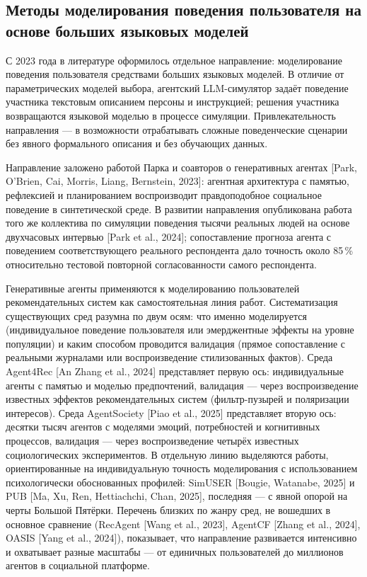 \subsection{Методы моделирования поведения пользователя на основе больших языковых моделей}

С 2023 года в литературе оформилось отдельное направление: моделирование поведения пользователя средствами больших языковых моделей. В отличие от параметрических моделей выбора, агентский LLM-симулятор задаёт поведение участника текстовым описанием персоны и инструкцией; решения участника возвращаются языковой моделью в процессе симуляции. Привлекательность направления --- в возможности отрабатывать сложные поведенческие сценарии без явного формального описания и без обучающих данных.

Направление заложено работой Парка и соавторов о генеративных агентах [Park, O'Brien, Cai, Morris, Liang, Bernstein, 2023]: агентная архитектура с памятью, рефлексией и планированием воспроизводит правдоподобное социальное поведение в синтетической среде. В развитии направления опубликована работа того же коллектива по симуляции поведения тысячи реальных людей на основе двухчасовых интервью [Park et al., 2024]; сопоставление прогноза агента с поведением соответствующего реального респондента дало точность около 85\,\% относительно тестовой повторной согласованности самого респондента.

Генеративные агенты применяются к моделированию пользователей рекомендательных систем как самостоятельная линия работ. Систематизация существующих сред разумна по двум осям: что именно моделируется (индивидуальное поведение пользователя или эмерджентные эффекты на уровне популяции) и каким способом проводится валидация (прямое сопоставление с реальными журналами или воспроизведение стилизованных фактов). Среда Agent4Rec [An Zhang et al., 2024] представляет первую ось: индивидуальные агенты с памятью и моделью предпочтений, валидация --- через воспроизведение известных эффектов рекомендательных систем (фильтр-пузырей и поляризации интересов). Среда AgentSociety [Piao et al., 2025] представляет вторую ось: десятки тысяч агентов с моделями эмоций, потребностей и когнитивных процессов, валидация --- через воспроизведение четырёх известных социологических экспериментов. В отдельную линию выделяются работы, ориентированные на индивидуальную точность моделирования с использованием психологически обоснованных профилей: SimUSER [Bougie, Watanabe, 2025] и PUB [Ma, Xu, Ren, Hettiachchi, Chan, 2025], последняя --- с явной опорой на черты Большой Пятёрки. Перечень близких по жанру сред, не вошедших в основное сравнение (RecAgent [Wang et al., 2023], AgentCF [Zhang et al., 2024], OASIS [Yang et al., 2024]), показывает, что направление развивается интенсивно и охватывает разные масштабы --- от единичных пользователей до миллионов агентов в социальной платформе.


